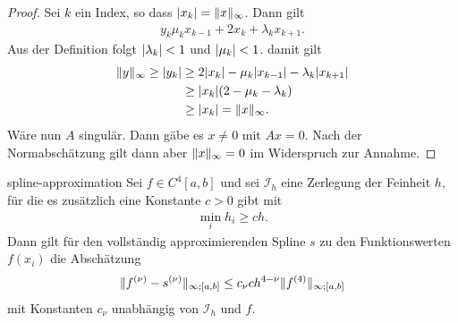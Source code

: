\begin{proof}
  Sei $k$ ein Index, so dass $\lvert x_k\rvert = \lVert x\rVert_\infty$. Dann gilt
  \begin{gather}
    y_k \mu_k x_{k-1} + 2 x_{k} + \lambda_k x_{k+1}.
  \end{gather}
  Aus der Definition folgt $\lvert\lambda_k\rvert< 1$ und $\lvert\mu_k\rvert <
  1$. damit gilt
  \begin{align*}
    \lVert y\rVert_{\infty} \ge \lvert y_k\rvert
    &\ge 2 \lvert x_k\rvert - \mu_k \lvert x_{k-1}\rvert - \lambda_k \lvert x_{k+1}\rvert\\
    &\ge \lvert x_k\rvert(2-\mu_k-\lambda_k)\\
    & \ge \lvert x_k\rvert = \lVert x\rVert_\infty.
  \end{align*}
  Wäre nun $A$ singulär. Dann gäbe es $x\neq 0$ mit $Ax = 0$. Nach der
  Normabschätzung gilt dann aber $\lVert x\rVert_\infty = 0$ im Widerspruch
  zur Annahme.
\end{proof}

\begin{Satz}{spline-approximation}
  Sei $f\in C^4[a,b]$ und sei $\mathcal I_h$ eine Zerlegung der
  Feinheit $h$, für die es zusätzlich eine Konstante $c>0$ gibt mit
  \begin{gather}
    \min_{i} h_i \ge c h.
  \end{gather}
  Dann gilt für den vollständig approximierenden Spline $s$ zu den
  Funktionswerten $f(x_i)$ die Abschätzung
  \begin{gather}
    \lVert f^{(\nu)}-s^{(\nu)}\rVert_{\infty;[a,b]}
    \le c_\nu c h^{4-\nu}\lVert f^{(4)}\rVert_{\infty;[a,b]}
  \end{gather}
  mit Konstanten $c_\nu$ unabhängig von $\mathcal I_h$ und $f$.
\end{Satz}

